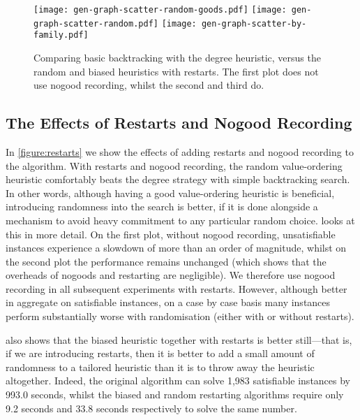 \documentclass[letterpaper]{article} %
\begin{document}
\begin{figure*}[tb]
    \texttt{[image: gen-graph-scatter-random-goods.pdf]}
    \hfill
    \texttt{[image: gen-graph-scatter-random.pdf]}
    \hfill
    \texttt{[image: gen-graph-scatter-by-family.pdf]}
    \caption{Comparing basic backtracking with the degree heuristic, versus the random and biased
    heuristics with restarts. The first plot does not use nogood recording, whilst the second and
    third do.}
    \label{figure:scatter-random}
\end{figure*}

\subsection{The Effects of Restarts and Nogood Recording}

In \cref{figure:restarts} we show the effects of adding restarts and nogood recording to the
algorithm. With restarts and nogood recording,
the random value-ordering heuristic comfortably beats the degree strategy with simple backtracking
search. In other
words, although having a good value-ordering heuristic is beneficial, introducing randomness into
the search is better, if it is done alongside a mechanism to avoid heavy commitment to any
particular random choice.  looks at
this in more detail. On the first plot, without nogood recording, unsatisfiable instances
experience a slowdown of more than an order of magnitude, whilst on the second plot the
performance remains unchanged (which shows that the overheads of nogoods and restarting are
negligible). We therefore use nogood recording in all subsequent experiments with restarts. However,
although better in aggregate on satisfiable instances, on a case by case basis many instances
perform substantially worse with randomisation (either with or without restarts).

 also shows that the biased heuristic together with restarts is better
still---that is, if we are introducing restarts, then it is better to add a small amount of
randomness to a tailored heuristic than it is to throw away the heuristic altogether.
Indeed, the original algorithm can solve 1,983 satisfiable instances by 993.0 seconds, whilst the
biased and random restarting algorithms require only 9.2 seconds and 33.8 seconds respectively to
solve the same number.
\end{document}
